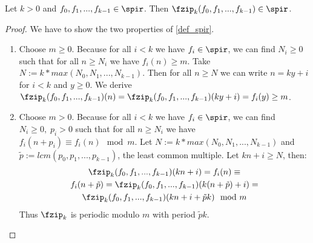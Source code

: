 \begin{lemma}\label{\fzip_spir}
	Let $k>0$ and $f_0,f_1,...,f_{k-1}\in\spir$. Then $\fzip_k(f_0,f_1,...,f_{k-1})\in\spir$.
	\begin{proof}
		We have to show the two properties of \cref{def_spir}.
		\begin{enumerate}
			\item Choose $m\geq 0$.
			Because for all $i<k$ we have $f_i\in\spir$, we can find $N_i\geq 0$ such that for all $n\geq N_i$ we have $f_i(n)\geq m$. Take $N := k*max(N_0,N_1,...,N_{k-1})$. Then for all $n\geq N$ we can write $n = ky + i$ for $i<k$ and $y\geq0$. We derive $\fzip_k(f_0,f_1,...,f_{k-1})(n) = \fzip_k(f_0,f_1,...,f_{k-1})(ky+i) = f_i(y) \geq m$.
			\item Choose $m > 0$.
			Because for all $i<k$ we have $f_i\in\spir$, we can find $N_i\geq 0,\; p_i>0$ such that for all $n\geq N_i$ we have $f_i(n+p_i) \equiv f_i(n) \mod m$. Let $N := k*max(N_0,N_1,...,N_{k-1})$ and $\tilde{p} := lcm(p_0,p_1,...,p_{k-1})$, the least common multiple. Let $kn+i \geq N$, then:
			\begin{gather*}
				\fzip_k(f_0,f_1,...,f_{k-1})(kn+i) = f_i(n) \equiv \\
				f_i(n + \tilde{p}) =
				\fzip_k(f_0,f_1,...,f_{k-1})(k(n+\tilde{p})+i) = \\
				\fzip_k(f_0,f_1,...,f_{k-1})(kn+i+\tilde{p}k) \mod m
			\end{gather*}
			Thus $\fzip_k$ is periodic modulo $m$ with period $\tilde{p}k$.
		\end{enumerate}
	\end{proof}
\end{lemma}



